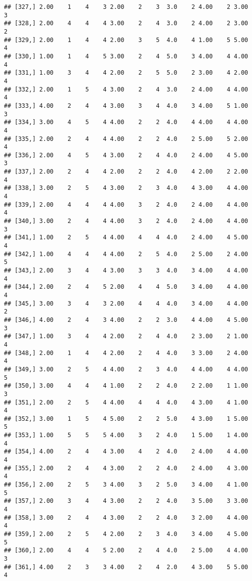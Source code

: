 \documentclass[]{article}
\begin{document}
\begin{verbatim}
## [327,] 2.00    1    4    3 2.00    2    3  3.0    2 4.00    2 3.00    3
## [328,] 2.00    4    4    4 3.00    2    4  3.0    2 4.00    2 3.00    2
## [329,] 2.00    1    4    4 2.00    3    5  4.0    4 1.00    5 5.00    4
## [330,] 1.00    1    4    5 3.00    2    4  5.0    3 4.00    4 4.00    4
## [331,] 1.00    3    4    4 2.00    2    5  5.0    2 3.00    4 2.00    4
## [332,] 2.00    1    5    4 3.00    2    4  3.0    2 4.00    4 4.00    4
## [333,] 4.00    2    4    4 3.00    3    4  4.0    3 4.00    5 1.00    3
## [334,] 3.00    4    5    4 4.00    2    2  4.0    4 4.00    4 4.00    4
## [335,] 2.00    2    4    4 4.00    2    2  4.0    2 5.00    5 2.00    4
## [336,] 2.00    4    5    4 3.00    2    4  4.0    2 4.00    4 5.00    3
## [337,] 2.00    2    4    4 2.00    2    2  4.0    4 2.00    2 2.00    4
## [338,] 3.00    2    5    4 3.00    2    3  4.0    4 3.00    4 4.00    4
## [339,] 2.00    4    4    4 4.00    3    2  4.0    2 4.00    4 4.00    4
## [340,] 3.00    2    4    4 4.00    3    2  4.0    2 4.00    4 4.00    3
## [341,] 1.00    2    5    4 4.00    4    4  4.0    2 4.00    4 5.00    4
## [342,] 1.00    4    4    4 4.00    2    5  4.0    2 5.00    2 4.00    5
## [343,] 2.00    3    4    4 3.00    3    3  4.0    3 4.00    4 4.00    4
## [344,] 2.00    2    4    5 2.00    4    4  5.0    3 4.00    4 4.00    4
## [345,] 3.00    3    4    3 2.00    4    4  4.0    3 4.00    4 4.00    2
## [346,] 4.00    2    4    3 4.00    2    2  3.0    4 4.00    4 5.00    3
## [347,] 1.00    3    4    4 2.00    2    4  4.0    2 3.00    2 1.00    4
## [348,] 2.00    1    4    4 2.00    2    4  4.0    3 3.00    2 4.00    4
## [349,] 3.00    2    5    4 4.00    2    3  4.0    4 4.00    4 4.00    5
## [350,] 3.00    4    4    4 1.00    2    2  4.0    2 2.00    1 1.00    3
## [351,] 2.00    2    5    4 4.00    4    4  4.0    4 3.00    4 1.00    4
## [352,] 3.00    1    5    4 5.00    2    2  5.0    4 3.00    1 5.00    5
## [353,] 1.00    5    5    5 4.00    3    2  4.0    1 5.00    1 4.00    4
## [354,] 4.00    2    4    4 3.00    4    2  4.0    2 4.00    4 4.00    4
## [355,] 2.00    2    4    4 3.00    2    2  4.0    2 4.00    4 3.00    4
## [356,] 2.00    2    5    3 4.00    3    2  5.0    3 4.00    4 1.00    5
## [357,] 2.00    3    4    4 3.00    2    2  4.0    3 5.00    3 3.00    4
## [358,] 3.00    2    4    4 3.00    2    2  4.0    3 2.00    4 4.00    4
## [359,] 2.00    2    5    4 2.00    2    3  4.0    3 4.00    4 5.00    5
## [360,] 2.00    4    4    5 2.00    2    4  4.0    2 5.00    4 4.00    3
## [361,] 4.00    2    3    3 4.00    2    4  2.0    4 3.00    5 5.00    4

\end{verbatim}
\end{document}
